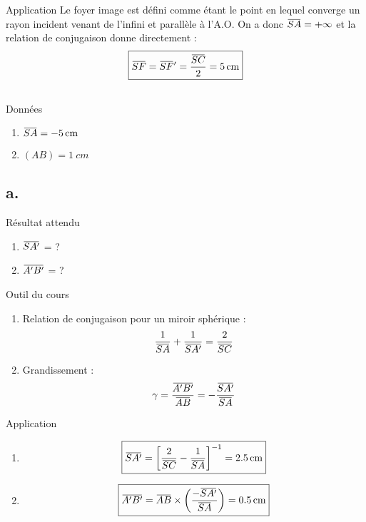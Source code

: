 \documentclass[10pt,a5paper,notitlepage]{book}
\begin{document}
\begin{NCexem}{Application}
    Le foyer image est défini comme étant le point en lequel converge un rayon
    incident venant de l'infini et parallèle à l'A.O. On a donc $\SA = +\infty$
    et la relation de conjugaison donne directement :
    \[ \boxed{\SF = \SF' = \frac{\SC}{2} = \SI{5}{cm}} \]
\end{NCexem}

\subsection{}
\begin{NCdefi}{Données}
    \begin{enumerate}
        \item $\SA = \SI{-5}{cm}$
        \item $(AB) = \SI{1}{cm}$
    \end{enumerate}
\end{NCdefi}

\setcounter{subsection}{1}
\subsection{a.}
\begin{NCprop}{Résultat attendu}
    \begin{enumerate}
        \item $\SAp$ = ?
        \item $\ABp$ = ?
    \end{enumerate}
\end{NCprop}

\begin{NCdemo}{Outil du cours}
    \begin{enumerate}
        \item Relation de conjugaison pour un miroir sphérique :
            \[ \frac{1}{\SA} + \frac{1}{\SAp} = \frac{2}{\SC} \]
        \item Grandissement :
            \[ \g = \frac{\ABp}{\ABb} = - \frac{\SAp}{\SA} \]
    \end{enumerate}
    
\end{NCdemo}

\begin{NCexem}{Application}
    \begin{enumerate}
        \item \[ \boxed{\SAp = \left[ \frac{2}{\SC}- \frac{1}{\SA}\right]^{-1} =
            \SI{+2.5}{cm}}\]
        \item \[ \boxed{\ABp = \ABb\times \LR{-\SAp}{\SA} = \SI{0.5}{cm}} \]
    \end{enumerate}
\end{NCexem}
\end{document}

